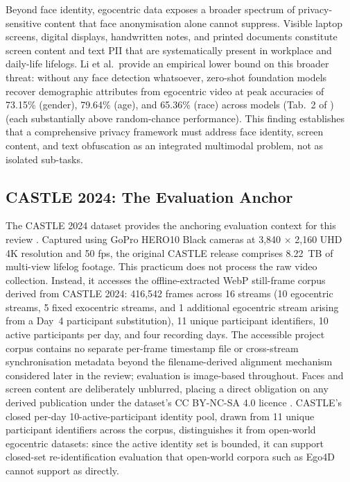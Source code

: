 \documentclass[12pt, onecolumn]{IEEEtran}
\begin{document}
Beyond face identity, egocentric data exposes a broader spectrum of privacy-sensitive content that face
anonymisation alone cannot suppress. Visible laptop screens, digital displays, handwritten notes, and printed
documents constitute screen content and text PII that are systematically present in workplace and daily-life
lifelogs. Li et al.\ provide an empirical lower bound on this broader threat: without any face detection
whatsoever, zero-shot foundation models recover demographic attributes from egocentric video at peak accuracies of
73.15\% (gender), 79.64\% (age), and 65.36\% (race) across models (Tab.~2 of \cite{li2025egoprivacy}) (each substantially above random-chance performance).
This finding establishes that a comprehensive privacy framework must address face identity,
screen content, and text obfuscation as an integrated multimodal problem, not as isolated sub-tasks.

\subsection{CASTLE 2024: The Evaluation Anchor}

The CASTLE 2024 dataset provides the anchoring evaluation context for this review \cite{rossetto2025castle}. Captured using GoPro
HERO10 Black cameras at 3,840 $\times$ 2,160 UHD 4K resolution and 50 fps, the original CASTLE release comprises
8.22~TB of multi-view lifelog footage. This practicum does not process the raw video collection. Instead, it accesses
the offline-extracted WebP still-frame corpus derived from CASTLE 2024: 416,542 frames across 16 streams
(10 egocentric streams, 5 fixed exocentric streams, and 1 additional egocentric stream arising from a Day~4
participant substitution), 11 unique participant identifiers, 10 active participants per day, and four recording
days. The accessible project corpus contains no separate per-frame timestamp file or cross-stream synchronisation
metadata beyond the filename-derived alignment mechanism considered later in the review; evaluation is image-based
throughout. Faces and screen content are deliberately unblurred, placing a direct obligation on any derived
publication under the dataset's CC BY-NC-SA 4.0 licence \cite{rossetto2025castle}. CASTLE's closed per-day
10-active-participant identity pool, drawn from 11 unique participant identifiers across the corpus, distinguishes
it from open-world egocentric datasets: since the active identity set is
bounded, it can support closed-set re-identification evaluation that open-world corpora such as Ego4D cannot support
as directly.
\end{document}
